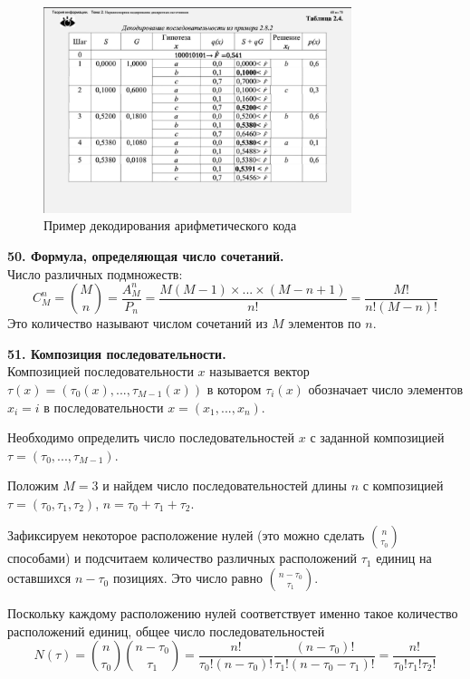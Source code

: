 \documentclass[14pt]{article}
\begin{document}
\begin{figure}[h!]
\centering
    \includegraphics[width=90mm]{aryph_decode_example.png}
\caption{Пример декодирования арифметического кода}
\end{figure}

\vskip3cm
\textbf{50. Формула, определяющая число сочетаний.} \\

Число различных подмножеств:
\begin{displaymath}
        C_M^n = \binom{M}{n} = \frac{A_M^n}{P_n} = \frac{M(M - 1) \times ... \times (M - n + 1)}{n!} = \frac{M!}{n!(M - n)!}
\end{displaymath}
Это количество называют числом сочетаний из \(M\) элементов по \(n\).

\bigskip
\textbf{51. Композиция последовательности.} \\

Композицией последовательности \(x\) называется вектор \(\tau(x) = (\tau_0(x) ,..., \tau_{M-1}(x))\) в котором \(\tau_i(x)\) обозначает число элементов \(x_i = i\) в последовательности \(x = (x_1,...,x_n)\).

Необходимо определить число последовательностей \(x\) с заданной композицией \(\tau = (\tau_0 ,..., \tau_{M-1})\).

Положим \(M = 3\) и найдем число последовательностей длины \(n\) с композицией \(\tau = (\tau_0, \tau_1, \tau_2)\), \(n = \tau_0 + \tau_1 + \tau_2\).

Зафиксируем некоторое расположение нулей (это можно сделать \(\binom{n}{\tau_0}\) способами) и подсчитаем количество различных расположений \(\tau_1\) единиц на оставшихся \(n - \tau_0\) позициях. Это число равно \(\binom{n - \tau_0}{\tau_1}\).

Поскольку каждому расположению нулей соответствует именно такое количество расположений единиц, общее число последовательностей
\begin{displaymath}
    N(\tau) = \binom{n}{\tau_0}\binom{n - \tau_0}{\tau_1} = \frac{n!}{\tau_0!(n - \tau_0)!} \frac{(n - \tau_0)!}{\tau_1!(n - \tau_0 - \tau_1)!} = \frac{n!}{\tau_0!\tau_1!\tau_2!}
\end{displaymath}
\end{document}
